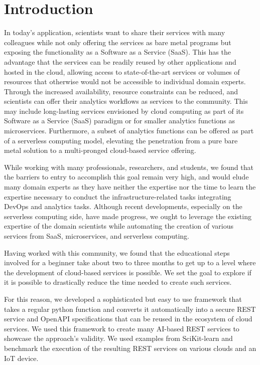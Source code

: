 
\section{Introduction}


In today's application, scientists want to share their services with many colleagues while not only offering the services as bare metal programs but exposing the functionality as a Software as a Service (SaaS). This has the advantage that the services can be readily reused by other applications and hosted in the cloud, allowing access to state-of-the-art services or volumes of resources that otherwise would not be accessible to individual domain experts. Through the increased availability, resource constraints can be reduced, and scientists can offer their analytics workflows as services to the community. This may include long-lasting services envisioned by cloud computing as part of its Software as a Service (SaaS) paradigm or for smaller analytics functions as microservices. Furthermore, a subset of analytics functions can be offered as part of a serverless computing model, elevating the penetration from a pure bare metal solution to a multi-pronged cloud-based service offering.

While working with many professionals, researchers, and students, we found that the barriers to entry to accomplish this goal remain very high, and would elude many domain experts as they have neither the expertise nor the time to learn the expertise necessary to conduct the infrastructure-related tasks integrating DevOps and analytics tasks. Although recent developments, especially on the serverless computing side, have made progress, we ought to leverage the existing expertise of the domain scientists while automating the creation of various services from SaaS, microservices, and serverless computing.

Having worked with this community, we found that the educational steps involved for a beginner take about two to three months to get up to a level where the development of cloud-based services is possible. We set the goal to explore if it is possible to drastically reduce the time needed to create such services.

For this reason, we developed a sophisticated but easy to use framework that takes a regular python function and converts it automatically into a secure REST service and OpenAPI specifications \cite{openapi} that can be reused in the ecosystem of cloud services. We used this framework to create many AI-based REST services to showcase the approach's validity. We used examples from SciKit-learn \cite{scikit-learn} and benchmark the execution of the resulting REST services on various clouds and an IoT device. 

